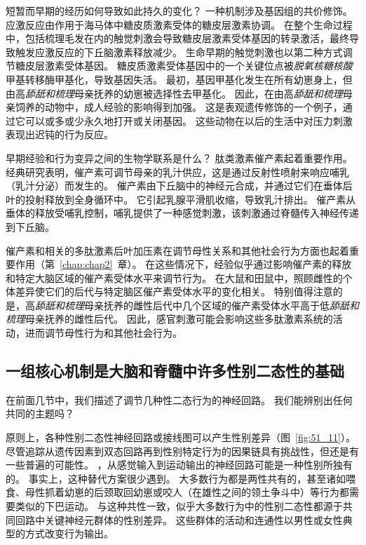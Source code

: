 短暂而早期的经历如何导致如此持久的变化？
一种机制涉及基因组的共价修饰。
应激反应由作用于海马体中糖皮质激素受体的糖皮层激素协调。
在整个生命过程中，包括梳理毛发在内的触觉刺激会导致糖皮层激素受体基因的转录激活，最终导致触发应激反应的下丘脑激素释放减少。
生命早期的触觉刺激也以第二种方式调节糖皮层激素受体基因。
糖皮质激素受体基因中的一个关键位点被\textit{脱氧核糖核酸}甲基转移酶甲基化，导致基因失活。
最初，基因甲基化发生在所有幼崽身上，但由高\textit{舔舐和梳理}母亲抚养的幼崽被选择性去甲基化。
因此，在由高\textit{舔舐和梳理}母亲饲养的动物中，成人经验的影响得到加强。
这是表观遗传修饰的一个例子，通过它可以或多或少永久地打开或关闭基因。
这些动物在以后的生活中对压力刺激表现出迟钝的行为反应。


早期经验和行为变异之间的生物学联系是什么？
肽类激素催产素起着重要作用。
经典研究表明，催产素可调节母亲的乳汁供应，这是通过反射性喷射来响应哺乳（乳汁分泌）而发生的。
催产素由下丘脑中的神经元合成，并通过它们在垂体后叶的投射释放到全身循环中。
它引起乳腺平滑肌收缩，导致乳汁排出。
催产素从垂体的释放受哺乳控制，哺乳提供了一种感觉刺激，该刺激通过脊髓传入神经传递到下丘脑。


催产素和相关的多肽激素后叶加压素在调节母性关系和其他社会行为方面也起着重要作用（第~\ref{chap:chap2}~章）。
在这些情况下，经验似乎通过影响催产素的释放和特定大脑区域的催产素受体水平来调节行为。
在大鼠和田鼠中，照顾雌性的个体差异使它们的后代与特定脑区催产素受体水平的变化相关。
特别值得注意的是，高\textit{舔舐和梳理}母亲抚养的雌性后代中几个区域的催产素受体水平高于低\textit{舔舐和梳理}母亲抚养的雌性后代。
因此，感官刺激可能会影响这些多肽激素系统的活动，进而调节母性行为和其他社会行为。



\subsection{一组核心机制是大脑和脊髓中许多性别二态性的基础}

在前面几节中，我们描述了调节几种性二态行为的神经回路。
我们能辨别出任何共同的主题吗？


原则上，各种性别二态性神经回路或接线图可以产生性别差异（图~\ref{fig:51_11}）。
尽管追踪从遗传因素到双态回路再到性别特定行为的因果链具有挑战性，但还是有一些普遍的可能性。 
，从感觉输入到运动输出的神经回路可能是一种性别所独有的。
事实上，这种替代方案很少遇到。
大多数行为都是两性共有的，甚至诸如喂食、母性抓着幼崽的后颈取回幼崽或咬人（在雄性之间的领土争斗中）等行为都需要类似的下巴运动。
与这种共性一致，似乎大多数行为中的性别二态性都源于共同回路中关键神经元群体的性别差异。
这些群体的活动和连通性以男性或女性典型的方式改变行为输出。


